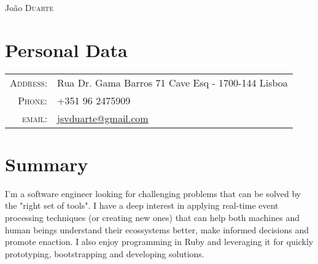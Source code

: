 \documentclass[a4paper,10pt]{article}
\begin{document}
\pagestyle{empty} %

\par{\centering
  {\Huge João \textsc{Duarte}
}\bigskip\par}

\section{Personal Data}

\begin{tabular}{rl}
    \textsc{Address:}   & Rua Dr. Gama Barros 71 Cave Esq - 1700-144 Lisboa\\
    \textsc{Phone:}     & +351 96 2475909\\
    \textsc{email:}     & \href{mailto:jsvduarte@gmail.com}{jsvduarte@gmail.com} \\
\end{tabular}

\section{Summary}
I'm a software engineer looking for challenging problems that can be solved by
the "right set of tools". I have a deep interest in applying real-time event processing
techniques (or creating new ones) that can help both machines and human beings understand
their ecossystems better, make informed decisions and promote enaction. I also enjoy programming in Ruby
and leveraging it for quickly prototyping, bootstrapping and developing solutions.

\end{document}
